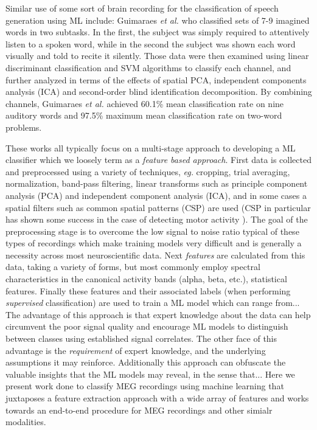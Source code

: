 \documentclass[utf8]{frontiersSCNS} %
\begin{document}
Similar use of some sort of brain recording for the classification of speech generation using ML include: Guimaraes {\em et al.} \cite{Guimaraes2007} who classified sets of 7-9 imagined words in two subtasks. In the first, the subject was simply required to attentively listen to a spoken word, while in the second the subject was shown each word visually and told to recite it silently. Those data were then examined using linear discriminant classification and SVM algorithms to classify each channel, and further analyzed in terms of the effects of spatial PCA, independent components analysis (ICA) and second-order blind identification decomposition. By combining channels, Guimaraes {\em et al.} achieved 60.1\% mean classification rate on nine auditory words and 97.5\% maximum mean classification rate on two-word problems.

These works all typically focus on a multi-stage approach to developing a ML classifier which we loosely term as a \emph{feature based approach}. First data is collected and preprocessed using a variety of techniques, \emph{eg.} cropping, trial averaging, normalization, band-pass filtering, linear transforms such as principle component analysis (PCA) and independent component analysis (ICA), and in some cases a spatial filters such as common spatial patterns (CSP) are used (CSP in particular has shown some success in the case of detecting motor activity \cite{}). The goal of the preprocessing stage is to overcome the low signal to noise ratio typical of these types of recordings which make training models very difficult and is generally a necessity across most neuroscientific data. Next \emph{features} are calculated from this data, taking a variety of forms, but  most commonly employ spectral characteristics in the canonical activity bands (alpha, beta, etc.), statistical features. Finally these features and their associated labels (when performing \emph{supervised} classification) are used to train a ML model which can range from... The advantage of this approach is that expert knowledge about the data can help circumvent the poor signal quality and encourage ML models to distinguish between classes using established signal correlates. The other face of this advantage is the \emph{requirement} of expert knowledge, and the underlying assumptions it may reinforce. Additionally this approach can obfuscate the valuable insights that the ML models may reveal, in the sense that... Here we present work done to classify MEG recordings using machine learning that juxtaposes a feature extraction approach with a wide array of features and works towards an end-to-end procedure for MEG recordings and other simialr modalities.
\end{document}
